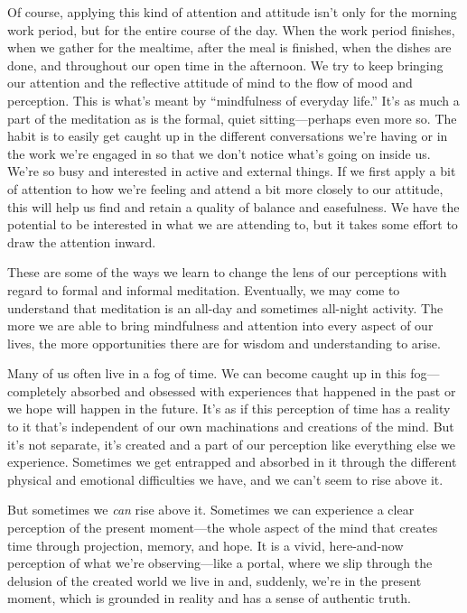 Of course, applying this kind of attention and attitude isn't only for 
the morning work period, but for the entire course of the day. When the 
work period finishes, when we gather for the mealtime, after the meal 
is finished, when the dishes are done, and throughout our open time in 
the afternoon. We try to keep bringing our attention and the reflective 
attitude of mind to the flow of mood and perception. This is what's 
meant by ``mindfulness of everyday life.'' It's as much a part of the 
meditation as is the formal, quiet sitting---perhaps even more so. The 
habit is to easily get caught up in the different conversations we're 
having or in the work we're engaged in so that we don't notice what's 
going on inside us. We're so busy and interested in active and external 
things. If we first apply a bit of attention to how we're feeling and 
attend a bit more closely to our attitude, this will help us find and 
retain a quality of balance and easefulness. We have the potential to 
be interested in what we are attending to, but it takes some effort to 
draw the attention inward.

These are some of the ways we learn to change the lens of our 
perceptions with regard to formal and informal meditation. Eventually, 
we may come to understand that meditation is an all-day and sometimes 
all-night activity. The more we are able to bring mindfulness and 
attention into every aspect of our lives, the more opportunities there 
are for wisdom and understanding to arise.


Many of us often live in a fog of time. We can become caught up in this 
fog---completely absorbed and obsessed with experiences that happened 
in the past or we hope will happen in the future. It's as if this 
perception of time has a reality to it that's independent of our own 
machinations and creations of the mind. But it's not separate, it's 
created and a part of our perception like everything else we 
experience. Sometimes we get entrapped and absorbed in it through the 
different physical and emotional difficulties we have, and we can't 
seem to rise above it.

But sometimes we \emph{can} rise above it. Sometimes we can experience 
a clear perception of the present moment---the whole aspect of the mind 
that creates time through projection, memory, and hope. It is a vivid, 
here-and-now perception of what we're observing---like a portal, where 
we slip through the delusion of the created world we live in and, 
suddenly, we're in the present moment, which is grounded in reality and 
has a sense of authentic truth.

